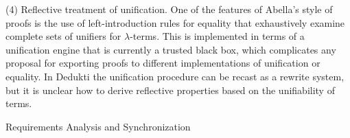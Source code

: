 \begin{workpackage}[id=theories,wphases=0-48,type=RTD,
  short=Theories in Dedukti,%
  title= Defining theories in Dedukti,
  lead=UIn,
  UInRM=10]
\begin{tasklist}
\begin{task}[id=abella,title=Express the theory of Abella in Dedukti and instrument the system]
(4) Reflective treatment of unification. One of the features of
Abella's style of proofs is the use of left-introduction rules for
equality that exhaustively examine complete sets of unifiers for
$\lambda$-terms. This is implemented in terms of a unification engine
that is currently a trusted black box, which complicates any proposal
for exporting proofs to different implementations of unification or
equality. In Dedukti the unification procedure can be recast as a
rewrite system, but it is unclear how to derive reflective properties
based on the unifiability of terms.
\end{task}

\begin{task}[title=id=hott,title=expressing HoTT]
\end{task}
\end{tasklist}

\begin{wpdelivs}
  \begin{wpdeliv}[due=3,miles=startup,id=requirements,dissem=PU,nature=DEM,lead=ISa]
      {Requirements Analysis and Synchronization}
\end{wpdeliv}
\end{wpdelivs}
\end{workpackage}


